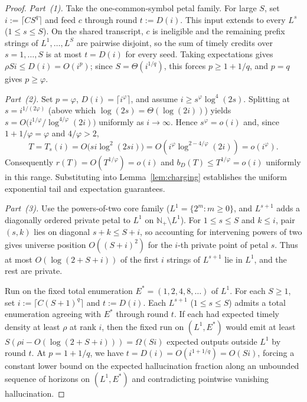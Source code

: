 \documentclass[11pt]{article}
\theoremstyle{plain}
\theoremstyle{definition}
\theoremstyle{remark}
\begin{document}
\begin{proof}
\emph{Part~(1).} Take the one-common-symbol petal family. For large $S$, set $i := \lceil C S^q \rceil$ and feed $c$ through round $t := D(i)$.
This input extends to every $L^s$ ($1 \le s \le S$).
On the shared transcript, $c$ is ineligible and the remaining prefix strings of $L^1, \dots, L^S$ are pairwise disjoint, so the sum of timely credits over $s = 1, \dots, S$ is at most $t = D(i)$ for every seed.
Taking expectations gives $\rho S i \le D(i) = O(i^p)$; since $S = \Theta(i^{1/q})$, this forces $p \ge 1 + 1/q$, and $p = q$ gives $p \ge \varphi$.

\emph{Part~(2).} Set $p = \varphi$, $D(i) = \lceil i^\varphi \rceil$, and assume $i \ge s^\varphi \log^4(2s)$.
Splitting at $s = i^{1/(2\varphi)}$ (above which $\log(2s) = \Theta(\log(2i))$) yields $s = O\bigl(i^{1/\varphi} / \log^{4/\varphi}(2i)\bigr)$ uniformly as $i \to \infty$.
Hence $s^\varphi = o(i)$ and, since $1 + 1/\varphi = \varphi$ and $4/\varphi > 2$,
\[
T = T_s(i) = O\bigl(si\log^2(2si)\bigr)
= O\!\left(i^\varphi \log^{2 - 4/\varphi}(2i)\right)
= o(i^\varphi).
\]
Consequently $r(T) = O(T^{1/\varphi}) = o(i)$ and $b_D(T) \le T^{1/\varphi} = o(i)$ uniformly in this range.
Substituting into Lemma~\ref{lem:charging} establishes the uniform exponential tail and expectation guarantees.

\emph{Part~(3).} Use the powers-of-two core family ($L^1 = \{2^m : m \ge 0\}$, and $L^{s+1}$ adds a diagonally ordered private petal to $L^1$ on $\mathbb{N}_+ \setminus L^1$).
For $1 \le s \le S$ and $k \le i$, pair $(s, k)$ lies on diagonal $s + k \le S + i$, so accounting for intervening powers of two gives universe position $O((S + i)^2)$ for the $i$-th private point of petal $s$.
Thus at most $O(\log(2 + S + i))$ of the first $i$ strings of $L^{s+1}$ lie in $L^1$, and the rest are private.

Run on the fixed total enumeration $E^* = (1, 2, 4, 8, \dots)$ of $L^1$.
For each $S \ge 1$, set $i := \lceil C(S + 1)^q \rceil$ and $t := D(i)$.
Each $L^{s+1}$ ($1 \le s \le S$) admits a total enumeration agreeing with $E^*$ through round $t$.
If each had expected timely density at least $\rho$ at rank $i$, then the fixed run on $(L^1, E^*)$ would emit at least $S(\rho i - O(\log(2 + S + i))) = \Omega(Si)$ expected outputs outside $L^1$ by round $t$.
At $p = 1 + 1/q$, we have $t = D(i) = O(i^{1 + 1/q}) = O(Si)$, forcing a constant lower bound on the expected hallucination fraction along an unbounded sequence of horizons on $(L^1, E^*)$ and contradicting pointwise vanishing hallucination.
\end{proof}
\end{document}
